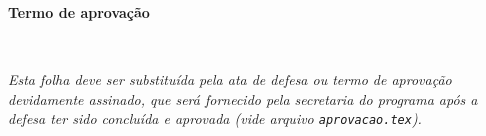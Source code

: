 
\begin{aprovacao}	%

\begin{center}
\textbf{Termo de aprovação}

~

\emph{Esta folha deve ser substituída pela ata de defesa ou termo de aprovação devidamente assinado, que será fornecido pela secretaria do programa após a defesa ter sido concluída e aprovada (vide arquivo \texttt{aprovacao.tex}).}
\end{center}

%

\end{aprovacao}

